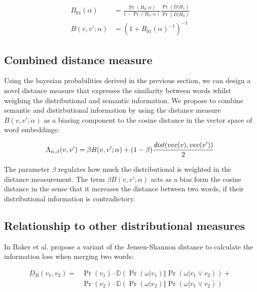 \begin{equation*}
\begin{split}
	B_{01}(\alpha) &= \frac{\Pr(H_0; \alpha)}{1-\Pr(H_0;
	\alpha)}\frac{\Pr(D|H_1)}{\Pr(D|H_0)} \\
	B(v,v'; \alpha) &= \left(1+{B_{01}(\alpha)}^{-1}\right)^{-1}	
\end{split}
\end{equation*}


\subsection{Combined distance measure}

Using the bayesian probabilities derived in the previous section, we can design
a novel distance measure that expresses the similarity between words whilst
weighing the distributional and semantic information. We propose to
combine semantic and distirbutional information by using the distance measure
$B(v,v';\alpha)$ as a biasing component to the cosine distance in the vector
space of word embeddings:

\begin{equation*}
	\Lambda_{\alpha,\beta}(v, v') = \beta B(v,v'; \alpha) +
	(1-\beta)\frac{\mathit{dist}(vec(v),vec(v'))}{2}
\end{equation*}

The parameter $\beta$ regulates how much the distributional is weighted in the
distance measurement. The term $\beta B(v,v'; \alpha)$ acts as a bias form the
cosine distance in the sense that it increases the distance between two words,
if their distributional information is contradictory. 
\subsection{Relationship to other distributional measures}

In \cite{baker1998distributional} Baker et al. propose a variant of the
Jensen-Shannon distance to calculate the information loss when merging two
words:

\begin{equation*}
\begin{split}
D_B(v_1, v_2) = &\Pr(v_1) \cdot
\mathbb{D}\left(\Pr(\omega|v_1)\Vert\Pr(\omega|v_1 \lor v_2)\right) + \\  
&\Pr(v_2) \cdot \mathbb{D}\left(\Pr(\omega|v_2)\Vert\Pr(\omega|v_1 \lor v_2)\right)
\end{split}
\end{equation*} 


